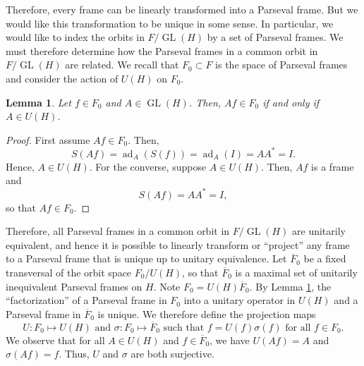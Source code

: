 \documentclass{article}
\newtheorem{lemma}[defn]{Lemma}
\newcommand{\ad}{\operatorname{ad}}
\newcommand{\GL}{\operatorname{GL}}
\newcommand{\Fbar}{\overline{F}}
\begin{document}
Therefore, every frame can be linearly transformed into a Parseval frame. But we would like this transformation to be unique in some sense. In particular, we would like to index the orbits in 
$F/\GL(H)$ by a set of Parseval frames. We must therefore determine how the Parseval frames in a common orbit in $F/\GL(H)$ are related. We recall that $F_0\subset F$ is the space of Parseval frames and consider the action of $U(H)$ on $F_0$.
\begin{lemma} \label{UnitaryParseval}
Let $f\in F_0$ and $A\in\GL(H)$. Then, $Af\in F_0$ if and only if $A\in U(H)$.
\end{lemma}
\begin{proof}
First assume $Af\in F_0$. Then,
\[ S(Af) = \ad_A(S(f))
= \ad_A(I)
= AA^*
= I. \]
Hence, $A\in U(H)$. For the converse, suppose $A\in U(H)$. Then, $Af$ is a frame and
\[ S(Af) = AA^* = I, \]
so that $Af\in F_0$.
\end{proof}

Therefore, all Parseval frames in a common orbit in $F/\GL(H)$ are unitarily equivalent, and hence it is possible to linearly transform or ``project'' any frame to a Parseval frame that is unique up to unitary equivalence. Let $\Fbar_0$ be a fixed transversal of the orbit space $F_0/U(H)$, so that $\Fbar_0$ is a maximal set of unitarily inequivalent Parseval frames on $H$. 
Note $F_0 = U(H)\Fbar_0$. By Lemma \ref{UnitaryParseval}, the ``factorization'' of a Parseval frame in $F_0$ into a unitary operator in $U(H)$ and a Parseval frame in $\Fbar_0$ is unique. We therefore define the projection maps
\begin{equation} \label{Usigma}
U:F_0\mapsto U(H) \mbox{ and } \sigma:F_0\mapsto \Fbar_0
\mbox{ such that } f = U(f)\sigma(f) \mbox{ for all } f\in F_0.
\end{equation}
We observe that for all $A\in U(H)$ and $f\in\Fbar_0$, we have $U(Af)=A$ and $\sigma(Af)=f$. Thus, $U$ and $\sigma$ are both surjective.
\end{document}

